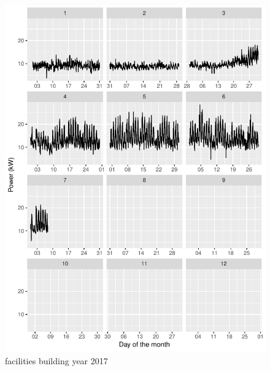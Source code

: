 \documentclass[11pt, oneside]{article}   	%
\begin{document}
\begin{figure}
\includegraphics[keepaspectratio]{facilities_build_Y2017.pdf}
\caption{facilities building year 2017 }
\end{figure}
\end{document}
